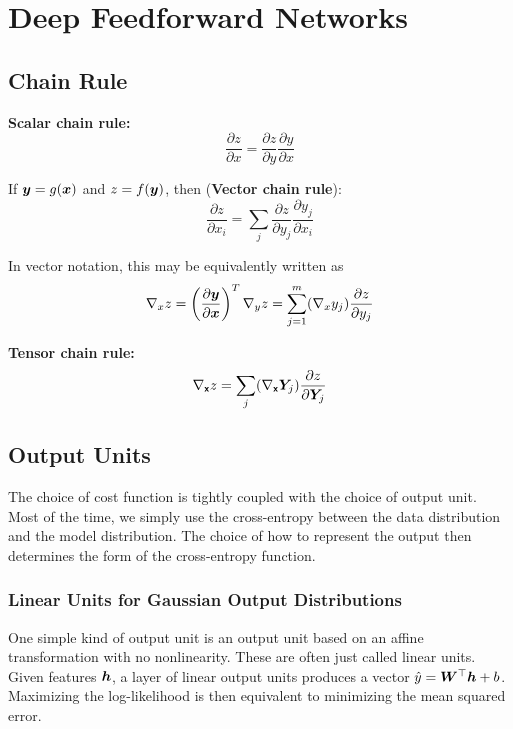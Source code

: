 \section{Deep Feedforward Networks}
\begin{multicols}{2}
	\subsection{Chain Rule}
	\textbf{Scalar chain rule:}
	\[ \frac{\partial z}{\partial x} = \frac{\partial z}{\partial y} \frac{\partial y}{\partial x} \]

	If $\bol{y}=g(\bol{x})$ and $z = f(\bol{y})$, then (\textbf{Vector chain rule}):
	\[ \frac{\partial z}{\partial x_i} = \sum_j \frac{\partial z}{\partial y_j} \frac{\partial y_j}{\partial x_i} \]

	In vector notation, this may be equivalently written as
	\[ \nabla_x z = \left( \frac{\partial \bol{y}}{\partial \bol{x}} \right)^T \nabla_y z
	= \sum_{j=1}^{m}(\nabla_xy_j) \frac{\partial z}{\partial y_j} \]

	\textbf{Tensor chain rule:}
	\[ \nabla_{\bm{\mathsf{x}}} z = \sum_j (\nabla_{\bm{\mathsf{x}}} \bol{Y}_j )\frac{\partial z}{\partial \bol{Y}_j} \]



	\subsection{Output Units}
	The choice of cost function is tightly coupled with the choice of output unit. Most	of the time, we simply use the cross-entropy between the data distribution and the	model distribution. The choice of how to represent the output then determines the form of the cross-entropy function.\\

	\subsubsection{Linear Units for Gaussian Output Distributions}
	One simple kind of output unit is an output unit based on an affine transformation with no nonlinearity. These are often just called linear units.
	Given features ${\bm{h}}$, a layer of linear output units produces a vector $\hat{y} = {\bm{W}} ^\top {\bm{h}} + b$.\\
	Maximizing the log-likelihood is then equivalent to minimizing the mean squared	error.



\end{multicols}
